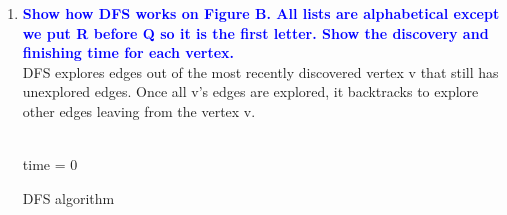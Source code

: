 \documentclass[11pt]{article}
\begin{document}
\begin{enumerate}
\item \textbf{\textcolor{blue}{Show how DFS works on Figure B. All lists are alphabetical except we put R before Q so it is the first letter. Show the discovery and finishing time for each vertex.}}
    \\ DFS explores edges out of the most recently discovered vertex v that still has unexplored edges. Once all v's edges are explored, it backtracks to explore other edges leaving from the vertex v.
    \begin{algorithm}[H]
    \Indm{}\\
    \Indp
        time = 0 \\
    \caption{DFS algorithm}
    \end{algorithm}
    

\end{enumerate}
\end{document}
